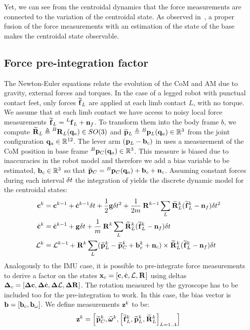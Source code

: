 Yet, we can see from the centroidal dynamics that the force measurements are connected to the variation of the centroidal state.
As observed in~\cite{carpentier2016center}, a proper fusion of the force measurements with an estimation of the state of the base makes the centroidal state observable.


\subsection{Force pre-integration factor}

The Newton-Euler equations  relate the evolution of the CoM and AM due to gravity, external forces and torques. 
In the case of a legged robot with punctual contact feet, only forces $\prescript{}{}{\widetilde{{\bf f}}}_{L}$ are applied at each limb contact $L$, with no torque. 
We assume that at each  limb contact we have access to noisy local force measurements $\prescript{}{}{\widetilde{{\bf f}}}_{L} = \prescript{L}{}{{\bf f}}_{L} + {\bf n}_f$. 
To transform them into the body frame $b$, we compute $\prescript{}{}{\widetilde{{\bf R}}}_{L} \triangleq \prescript{B}{}{{\bf R}}_{L}({\bf q}_a)  \in SO(3)$ and $\prescript{}{}{\widetilde{{\bf p}}}_{L} \triangleq \prescript{B}{}{{\bf p}}_{L}({\bf q}_a) \in \mathbb{R}^3 $ from the joint configuration ${\bf q}_a  \in \mathbb{R}^{12}$. 
The lever arm $(\prescript{}{}{{\bf p}}_{L}-{\bf b}_c)$ in  uses a measurement of the CoM position in base frame $ \prescript{B}{}{{\bf p}}_{C}({\bf q}_a) \in \mathbb{R}^3$. 
This measure is biased due to inaccuracies in the robot model and therefore we add a bias variable to be estimated, ${\bf b}_c \in \mathbb{R}^3$ so that $\prescript{}{}{\widetilde{{\bf p}}}_{C} = \prescript{B}{}{{\bf p}}_{C}({\bf q}_a) + {\bf b}_c + {\bf n}_c$.
Assuming constant forces during each interval $\delta t$ 
the integration of  yields the discrete dynamic model for the centroidal states:
%
\begin{equation}
\begin{split}
{\bf c}^{k} &= {\bf c}^{k-1} + \dot{{\bf c}}^{k-1} \delta t+\frac{1}{2} {\bf g} \delta t^2 + \frac{1}{2m} \prescript{}{}{{\bf R}}_{}^{k-1} \sum_L \prescript{}{}{\widetilde{{\bf R}}}_{L}^k (\prescript{}{}{\widetilde{{\bf f}}}_{L}^k - {\bf n}_{f}) \delta t^2
\\
\dot{{\bf c}}^{k}&= \dot{{\bf c}}^{k-1} + {\bf g} \delta t + \frac{1}{m} \prescript{}{}{{\bf R}}_{}^k \sum_L\prescript{}{}{\widetilde{{\bf R}}}_{L}^k (\prescript{}{}{\widetilde{{\bf f}}}_{L}^k - {\bf n}_{f}) \delta t 
\\
\mathcal{L}^{k} &= \mathcal{L}^{k-1} +\prescript{}{}{{\bf R}}_{}^k \sum_L (\prescript{}{}{\widetilde{{\bf p}}}_{L}^k  - \prescript{}{}{\widetilde{{\bf p}}}_{C}^k +  {\bf b}_{c}^k + {\bf n}_{c}) \times \prescript{}{}{\widetilde{{\bf R}}}_{L}^k(\prescript{}{}{\widetilde{{\bf f}}}_{L}^k - {\bf n}_{f}) \delta t
\end{split}
\label{eq:COMDiscrete}
\end{equation}
%
Analogously to the IMU case, it is possible to pre-integrate force measurements to derive a factor on the states 
${\bf x}_c=[{\bf c}, \dot{{\bf c}}, \mathcal{L}, \prescript{}{}{{\bf R}}_{}]$ using deltas ${{\bm \Delta}}_c=[{{\bm \Delta}}{\bf c}, {{\bm \Delta}}\dot{{\bf c}}, {{\bm \Delta}}\mathcal{L}, {\bm \Delta {\bf R}}]$. 
The rotation measured by the gyroscope has to be included too for the pre-integration to work. 
In this case, the bias vector is ${\bf b} = [{\bf b}_c, {\bf b}_{\omega}]$. We define measurements  ${\bf z}^k$ to be:
%
\begin{equation}
{\bf z}^k = \left[ \prescript{}{}{\widetilde{{\bf p}}}_{C}^k, \prescript{}{}{\widetilde{\pmb{\omega}}}_{}^k, \left[\prescript{}{}{\widetilde{{\bf f}}}_{L}^k, \prescript{}{}{\widetilde{{\bf p}}}_{L}^k, \prescript{}{}{\widetilde{{\bf R}}}_{L}^k \right]_{L=1..4}\right]
\end{equation}

